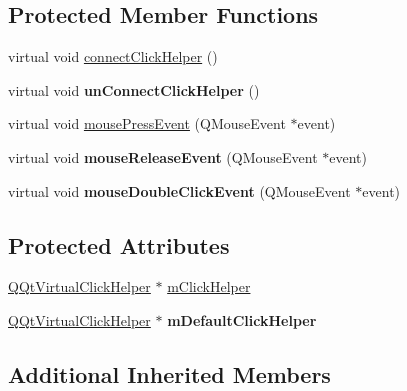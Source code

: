\subsection*{Protected Member Functions}
\begin{DoxyCompactItemize}
\item 
virtual void \mbox{\hyperlink{class_q_qt_virtual_click_widget_a2e9874c5ec5aba763426dcacb012d7a7}{connect\+Click\+Helper}} ()
\item 
\mbox{\label{class_q_qt_virtual_click_widget_af3eed205a7b17dba47e9617c29b37514}} 
virtual void {\bfseries un\+Connect\+Click\+Helper} ()
\item 
virtual void \mbox{\hyperlink{class_q_qt_virtual_click_widget_ac0e5a03607e6c28036596fb4b6f709eb}{mouse\+Press\+Event}} (Q\+Mouse\+Event $\ast$event)
\item 
\mbox{\label{class_q_qt_virtual_click_widget_a28c727fc0fc748f1e5c493d070413eab}} 
virtual void {\bfseries mouse\+Release\+Event} (Q\+Mouse\+Event $\ast$event)
\item 
\mbox{\label{class_q_qt_virtual_click_widget_ada5af8a3eaf9e190a5a11a397c4cab29}} 
virtual void {\bfseries mouse\+Double\+Click\+Event} (Q\+Mouse\+Event $\ast$event)
\end{DoxyCompactItemize}
\subsection*{Protected Attributes}
\begin{DoxyCompactItemize}
\item 
\mbox{\hyperlink{class_q_qt_virtual_click_helper}{Q\+Qt\+Virtual\+Click\+Helper}} $\ast$ \mbox{\hyperlink{class_q_qt_virtual_click_widget_aba7e163132ae350d10f1bc4f395c7f31}{m\+Click\+Helper}}
\item 
\mbox{\label{class_q_qt_virtual_click_widget_a2c2c0c0d2ede1542c23c1a293e98825d}} 
\mbox{\hyperlink{class_q_qt_virtual_click_helper}{Q\+Qt\+Virtual\+Click\+Helper}} $\ast$ {\bfseries m\+Default\+Click\+Helper}
\end{DoxyCompactItemize}
\subsection*{Additional Inherited Members}


